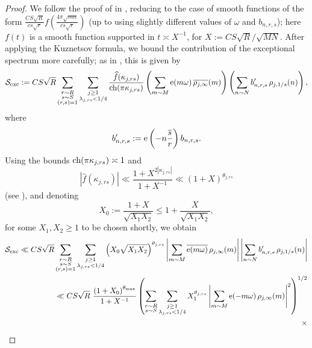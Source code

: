\documentclass[reqno,11pt]{amsart}
\theoremstyle{definition}
\theoremstyle{remark}
\numberwithin{equation}{section}
\newcommand{\mS}{\mathcal{S}}
\newcommand{\e}{\textnormal{e}}
\renewcommand{\bar}{\overline}
\renewcommand{\hat}{\widehat}
\newcommand{\ch}{\textnormal{ch}}
\begin{document}
\begin{proof}
We follow the proof of \cite[Theorem 11]{deshouillers1982kloosterman} in \cite[Section 9.1]{deshouillers1982kloosterman}, reducing to the case of smooth functions of the form $\frac{CS\sqrt{R}}{cs\sqrt{r}} f \left(\frac{4\pi \sqrt{mn}}{cs\sqrt{r}}\right)$ (up to using slightly different values of $\omega$ and $b_{n,r,s}$); here $f(t)$ is a smooth function supported in $t \asymp X^{-1}$, for $X := CS\sqrt{R}/\sqrt{MN}$. After applying the Kuznetsov formula, we bound the contribution of the exceptional spectrum more carefully; as in \cite[p.\ 279]{deshouillers1982kloosterman}, this is given by
\[
    \mS_{\text{exc}} := CS\sqrt{R}
    \sum_{\substack{r \sim R \\ s \sim S \\ (r, s) = 1}}
    \sum_{\substack{j \ge 1 \\ \lambda_{j,rs} < 1/4}} \frac{\hat{f}(\kappa_{j,rs})}{\ch(\pi \kappa_{j,rs})}
    \left( \sum_{m \sim M} \e(m\omega)\, \bar{\rho_{j,\infty}}(m) \right)
    \left( \sum_{n \sim N} b'_{n,r,s}\, \rho_{j,1/s}(n)
    \right),
\]
where
\[
    b'_{n,r,s} := \e\left(-n \frac{\bar{s}}{r}\right) b_{n,r,s}.
\]
Using the bounds $\ch(\pi \kappa_{j,rs}) \asymp 1$ and 
\[
    |\hat{f}(\kappa_{j,rs})| \ll \frac{1 + X^{2|\kappa_{j,rs}|}}{1 + X^{-1}} 
    \ll 
    (1 + X)^{\theta_{j,rs}}
\]
(see \cite[(7.1)]{deshouillers1982kloosterman}), and denoting
\[
    X_0 := \frac{1 + X}{\sqrt{X_1 X_2}}
    \le 
    1 + \frac{X}{\sqrt{X_1 X_2}},
\]
for some $X_1, X_2 \ge 1$ to be chosen shortly, we obtain
\[
\begin{aligned}
    \mS_{\text{exc}} 
    \ll
    CS\sqrt{R}
    \sum_{\substack{r \sim R \\ s \sim S \\ (r, s) = 1}}
    \sum_{\substack{j \ge 1 \\ \lambda_{j,rs} < 1/4}} \left(X_0 \sqrt{X_1 X_2}\right)^{\theta_{j,rs}}
    \left\vert \sum_{m \sim M} \bar{\e(m\omega)}\, \rho_{j,\infty}(m) \right\vert
    \left\vert \sum_{n \sim N} b'_{n,r,s}\, \rho_{j,1/s}(n)
    \right\vert
    \\
    \ll
    CS\sqrt{R}\
    \frac{\left(1 + X_0\right)^{\theta_{\max}}}{1 + X^{-1}}
    \left(\sum_{\substack{r \sim R \\ s \sim S}} \sum_{\substack{j \ge 1 \\ \lambda_{j,rs} < 1/4}} X_1^{\theta_{j,rs}} \left\vert \sum_{m \sim M} \e(-m\omega)\, \rho_{j,\infty}(m) \right\vert^2 \right)^{1/2}
    \\
    \times 

\end{aligned}\]
\end{proof}
\end{document}
